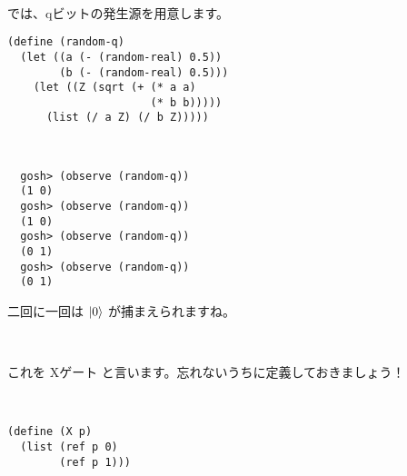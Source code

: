 \hline
\begin{minipage}{.01\hsize}
  ~
\end{minipage}
\begin{minipage}{.39\hsize}
  では、qビットの発生源を用意します。
  \begin{verbatim}
(define (random-q)
  (let ((a (- (random-real) 0.5))
        (b (- (random-real) 0.5)))
    (let ((Z (sqrt (+ (* a a)
                      (* b b)))))
      (list (/ a Z) (/ b Z)))))
  \end{verbatim}
\end{minipage}
\begin{minipage}{.10\hsize}
  ~
\end{minipage}
\begin{minipage}{.39\hsize}
  \begin{verbatim}
  gosh> (observe (random-q))
  (1 0)
  gosh> (observe (random-q))
  (1 0)
  gosh> (observe (random-q))
  (0 1)
  gosh> (observe (random-q))
  (0 1)
  \end{verbatim}
  二回に一回は $| 0 \rangle$ が捕まえられますね。
\end{minipage}




\hline
\begin{minipage}{.01\hsize}
  ~
\end{minipage}
\begin{minipage}{.39\hsize}
  これを Xゲート
  と言います。忘れないうちに定義しておきましょう！
\end{minipage}
\begin{minipage}{.10\hsize}
  ~
\end{minipage}
\begin{minipage}{.39\hsize}
  \begin{verbatim}
(define (X p)
  (list (ref p 0)
        (ref p 1)))
  \end{verbatim}
\end{minipage}

